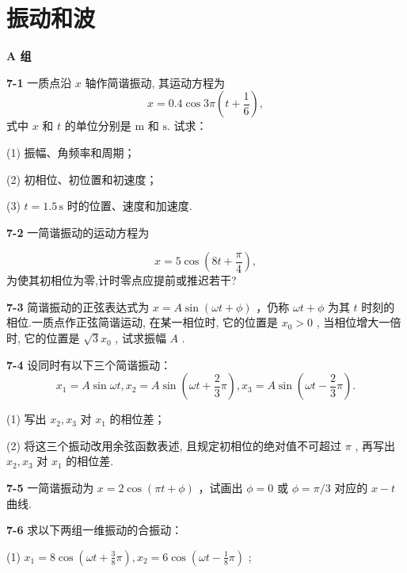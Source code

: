 \chapter{振动和波}
\begin{center}\textbf{A 组}\end{center}

\textbf{7-1} 一质点沿 $x$ 轴作简谐振动, 其运动方程为
\[
x = 0.4 \cos 3 \pi \left(t + \frac {1}{6}\right),
\]
式中 $x$ 和 $t$ 的单位分别是 $\mathrm m$ 和 $\mathrm s$. 试求：

(1) 振幅、角频率和周期；

(2) 初相位、初位置和初速度；

(3) $t=1.5\,\mathrm s$ 时的位置、速度和加速度.

\newpage

\textbf{7-2} 一简谐振动的运动方程为

\[
x = 5 \cos \left(8 t + \frac {\pi}{4}\right),
\]
为使其初相位为零,计时零点应提前或推迟若干?

\newpage

\textbf{7-3} 简谐振动的正弦表达式为 $x = A \sin(\omega t + \phi)$ ，仍称 $\omega t + \phi$ 为其 $t$ 时刻的相位.一质点作正弦简谐运动, 在某一相位时, 它的位置是 $x_0 > 0$ , 当相位增大一倍时, 它的位置是 $\sqrt{3} x_0$ , 试求振幅 $A$ .

\newpage

\textbf{7-4} 设同时有以下三个简谐振动：
\[
x _ {1} = A \sin \omega t,x _ {2} = A \sin \left(\omega t + \frac {2}{3} \pi\right),x _ {3} = A \sin \left(\omega t - \frac {2}{3} \pi\right).
\]

(1) 写出 $x_{2}, x_{3}$ 对 $x_{1}$ 的相位差；

(2) 将这三个振动改用余弦函数表述, 且规定初相位的绝对值不可超过 $\pi$ , 再写出 $x_{2}, x_{3}$ 对 $x_{1}$ 的相位差.

\newpage

\textbf{7-5} 一简谐振动为 $x = 2\cos (\pi t + \phi)$ ，试画出 $\phi = 0$ 或 $\phi = \pi /3$ 对应的 $x - t$ 曲线.

\newpage

\textbf{7-6} 求以下两组一维振动的合振动：

(1) $x_{1} = 8\cos \left(\omega t + \frac{3}{8}\pi\right), x_{2} = 6\cos \left(\omega t - \frac{1}{8}\pi\right)$ ;

